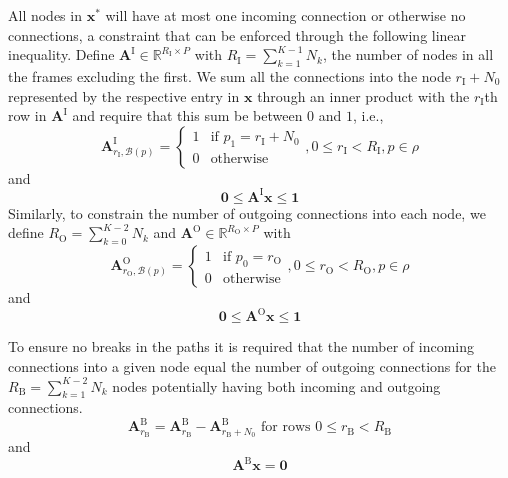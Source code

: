 \documentclass{article}
\newcommand{\BS}[1]{\boldsymbol{#1}}
\begin{document}
\begin{sloppy}
All nodes in $\BS{x}^{\ast}$ will have at most one incoming connection or
otherwise no connections, a constraint that can be enforced through the
following linear inequality. Define $\BS{A}^{\text{I}} \in
\mathbb{R}^{R_{\text{I}} \times P}$ with $R_{\text{I}} = \sum_{k=1}^{K-1}
N_{k}$, the number of nodes in all the frames excluding the first. We sum all
the connections into the node $r_{\text{I}} + N_{0}$ represented by the
respective entry in $\BS{x}$ through an inner product with the $r_{\text{I}}$th
row in $\BS{A}^{\text{I}}$ and require that this sum be between $0$ and $1$,
i.e.,
\begin{equation}
    \BS{A}^{\text{I}}_{r_{\text{I}},\mathcal{B}(p)} = \begin{cases}
        1 & \text{if } p_{1} = r_{\text{I}}+N_{0} \\
        0 & \text{otherwise}
    \end{cases}, 0 \leq r_{\text{I}} < R_{\text{I}}, p \in \rho
\end{equation}
and
\begin{equation}
    \BS{0} \leq \BS{A}^{\text{I}}\BS{x} \leq \BS{1}
\end{equation}
Similarly, to constrain the number of outgoing connections into each node, we
define $R_{\text{O}} = \sum_{k=0}^{K-2} N_{k}$ and
$\BS{A}^{\text{O}} \in \mathbb{R}^{R_{\text{O}} \times P}$ with
\begin{equation}
    \BS{A}^{\text{O}}_{r_{\text{O}},\mathcal{B}(p)} = \begin{cases}
        1 & \text{if } p_{0} = r_{\text{O}} \\
        0 & \text{otherwise}
    \end{cases}, 0 \leq r_{\text{O}} < R_{\text{O}}, p \in \rho
\end{equation}
and
\begin{equation}
    \BS{0} \leq \BS{A}^{\text{O}}\BS{x} \leq \BS{1}
\end{equation}

To ensure no breaks in the paths it is required that the number of incoming
connections into a given node equal the number of outgoing connections for the
$R_{\text{B}} = \sum_{k=1}^{K-2} N_{k}$ nodes potentially having both incoming
and outgoing connections.
\begin{equation}
    \BS{A}^{\text{B}}_{r_{\text{B}}} = \BS{A}^{\text{B}}_{r_{\text{B}}} -
    \BS{A}^{\text{B}}_{r_{\text{B}}+N_{0}} \text{ for rows } 0 \leq r_{\text{B}}
    < R_{\text{B}}
\end{equation}
and
\begin{equation}
    \label{eq:cxnbalcon}
    \BS{A}^{\text{B}}\BS{x} = \BS{0}
\end{equation}


\end{sloppy}
\end{document}
